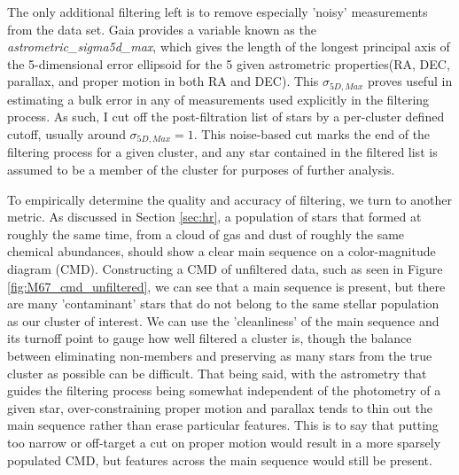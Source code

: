 \documentclass[onecolumn,table,xcdraw,super]{aastex631}
\begin{document}
The only additional filtering left is to remove especially 'noisy' measurements from the data set. Gaia provides a variable known as the \textit{astrometric\_sigma5d\_max}, which gives the length of the longest principal axis of the 5-dimensional error ellipsoid for the 5 given astrometric properties(RA, DEC, parallax, and proper motion in both RA and DEC). This $\sigma_{5D,Max}$ proves useful in estimating a bulk error in any of measurements used explicitly in the filtering process. As such, I cut off the post-filtration list of stars by a per-cluster defined cutoff, usually around  $\sigma_{5D,Max}=1$. This noise-based cut marks the end of the filtering process for a given cluster, and any star contained in the filtered list is assumed to be a member of the cluster for purposes of further analysis.

To empirically determine the quality and accuracy of filtering, we turn to another metric. As discussed in Section \ref{sec:hr}, a population of stars that formed at roughly the same time, from a cloud of gas and dust of roughly the same chemical abundances, should show a clear main sequence on a color-magnitude diagram (CMD). Constructing a CMD of unfiltered data, such as seen in Figure \ref{fig:M67_cmd_unfiltered}, we can see that a main sequence is present, but there are many 'contaminant' stars that do not belong to the same stellar population as our cluster of interest. We can use the 'cleanliness' of the main sequence and its turnoff point to gauge how well filtered a cluster is, though the balance between eliminating non-members and preserving as many stars from the true cluster as possible can be difficult. That being said, with the astrometry that guides the filtering process being somewhat independent of the photometry of a given star, over-constraining proper motion and parallax tends to thin out the main sequence rather than erase particular features. This is to say that putting too narrow or off-target a cut on proper motion would result in a more sparsely populated CMD, but features across the main sequence would still be present.
\end{document}
